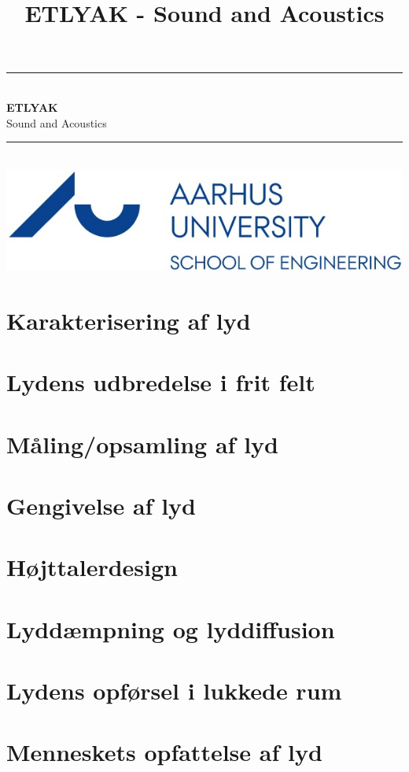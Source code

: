 \documentclass[12pt,a4paper,danish]{book}
\title{ETLYAK - Sound and Acoustics}
\newcommand{\HRule}{\rule{\linewidth}{0.5mm}}
\begin{document}
\begin{titlepage}
	\clearpage\thispagestyle{empty}

	\begin{center}
		\HRule \\[0.4cm]
		{\huge \bfseries ETLYAK} \\[.3cm] {\huge Sound and Acoustics}\\[0cm]		
		\HRule \\[3.4cm]
		\includegraphics[width=0.5\linewidth]{graphics/au}
	\end{center}
	\renewcommand{\contentsname}{Indholdsfortegnelse}
	\tableofcontents

\end{titlepage}
 

\chapter{Karakterisering af lyd}



\chapter{Lydens udbredelse i frit felt}


\chapter{Måling/opsamling af lyd}


\chapter{Gengivelse af lyd}


\chapter{Højttalerdesign}


\chapter{Lyddæmpning og lyddiffusion}


\chapter{Lydens opførsel i lukkede rum}

\chapter{Menneskets opfattelse af lyd}
\end{document}
